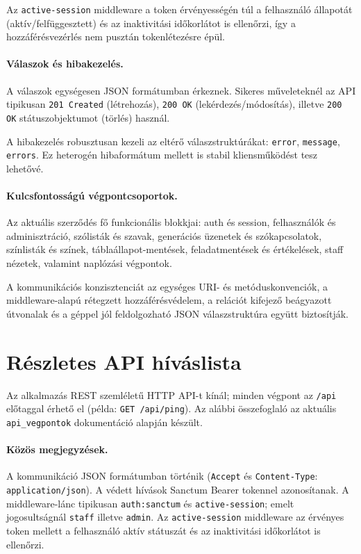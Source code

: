 \documentclass{thesis-ekf}
\begin{document}
Az \texttt{active-session} middleware a token érvényességén túl a felhasználó állapotát (aktív/felfüggesztett) és az inaktivitási időkorlátot is ellenőrzi, így a hozzáférésvezérlés nem pusztán tokenlétezésre épül.

\paragraph{Válaszok és hibakezelés.}
A válaszok egységesen JSON formátumban érkeznek. Sikeres műveleteknél az API tipikusan \texttt{201 Created} (létrehozás), \texttt{200 OK} (lekérdezés/módosítás), illetve \texttt{200 OK} státuszobjektumot (törlés) használ.

A hibakezelés robusztusan kezeli az eltérő válaszstruktúrákat: \texttt{error}, \texttt{message}, \texttt{errors}. Ez heterogén hibaformátum mellett is stabil kliensműködést tesz lehetővé.

\paragraph{Kulcsfontosságú végpontcsoportok.}
Az aktuális szerződés fő funkcionális blokkjai: auth és session, felhasználók és adminisztráció, szólisták és szavak, generációs üzenetek és szókapcsolatok, színlisták és színek, táblaállapot-mentések, feladatmentések és értékelések, staff nézetek, valamint naplózási végpontok.

A kommunikációs konzisztenciát az egységes URI- és metóduskonvenciók, a middleware\allowbreak-alapú rétegzett hozzáférésvédelem, a relációt kifejező beágyazott útvonalak és a géppel jól feldolgozható JSON válaszstruktúra együtt biztosítják.

\section{Részletes API híváslista}
Az alkalmazás REST szemléletű HTTP API-t kínál; minden végpont az \texttt{/api} előtaggal érhető el (példa: \texttt{GET /api/ping}). Az alábbi összefoglaló az aktuális \texttt{api\_vegpontok} dokumentáció alapján készült.

\paragraph{Közös megjegyzések.}
A kommunikáció JSON formátumban történik (\texttt{Accept} és \texttt{Content-Type}: \texttt{application/json}). A védett hívások Sanctum Bearer tokennel azonosítanak. A middleware-lánc tipikusan \texttt{auth:sanctum} és \texttt{active-session}; emelt jogosultságnál \texttt{staff} illetve \texttt{admin}. Az \texttt{active-session} middleware az érvényes token mellett a felhasználó aktív státuszát és az inaktivitási időkorlátot is ellenőrzi.
\end{document}
